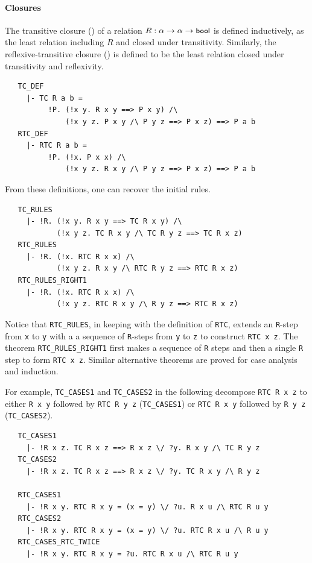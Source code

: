 \paragraph {Closures}

The transitive closure () of a relation $R : \alpha
\to\alpha\to\mbox{\small{\textbf{\sf{bool}}}}$ is defined inductively, as the least
relation including $R$ and closed under transitivity. Similarly, the
reflexive-transitive closure () is defined to be the least
relation closed under transitivity and reflexivity.
%
\begin{hol}
\begin{verbatim}
   TC_DEF
     |- TC R a b =
          !P. (!x y. R x y ==> P x y) /\
              (!x y z. P x y /\ P y z ==> P x z) ==> P a b
   RTC_DEF
     |- RTC R a b =
          !P. (!x. P x x) /\
              (!x y z. R x y /\ P y z ==> P x z) ==> P a b
\end{verbatim}
\end{hol}

\noindent
From these definitions, one can recover the initial rules.
%
\begin{hol}
\begin{verbatim}
   TC_RULES
     |- !R. (!x y. R x y ==> TC R x y) /\
            (!x y z. TC R x y /\ TC R y z ==> TC R x z)
   RTC_RULES
     |- !R. (!x. RTC R x x) /\
            (!x y z. R x y /\ RTC R y z ==> RTC R x z)
   RTC_RULES_RIGHT1
     |- !R. (!x. RTC R x x) /\
            (!x y z. RTC R x y /\ R y z ==> RTC R x z)
\end{verbatim}
\end{hol}
%
Notice that {\small\verb+RTC_RULES+}, in keeping with the definition
of {\small\verb+RTC+}, extends an \verb+R+-step from \verb+x+ to
\verb+y+ with a a sequence of \verb+R+-steps from \verb+y+ to \verb+z+
to construct \verb+RTC x z+. The theorem
{\small\verb+RTC_RULES_RIGHT1+} first makes a sequence of \verb+R+
steps and then a single \verb+R+ step to form \verb+RTC x z+. Similar
alternative theorems are proved for case analysis and induction.

For example, {\small\verb+TC_CASES1+} and {\small\verb+TC_CASES2+} in the
following decompose {\small\verb+RTC R x z+} to either
{\small\verb+R x y+} followed by {\small\verb+RTC R y z+}
({\small\verb+TC_CASES1+})
or
{\small\verb+RTC R x y+} followed by {\small\verb+R y z+}
({\small\verb+TC_CASES2+}).

%
\begin{hol}
\begin{verbatim}
   TC_CASES1
     |- !R x z. TC R x z ==> R x z \/ ?y. R x y /\ TC R y z
   TC_CASES2
     |- !R x z. TC R x z ==> R x z \/ ?y. TC R x y /\ R y z

   RTC_CASES1
     |- !R x y. RTC R x y = (x = y) \/ ?u. R x u /\ RTC R u y
   RTC_CASES2
     |- !R x y. RTC R x y = (x = y) \/ ?u. RTC R x u /\ R u y
   RTC_CASES_RTC_TWICE
     |- !R x y. RTC R x y = ?u. RTC R x u /\ RTC R u y
\end{verbatim}
\end{hol}

